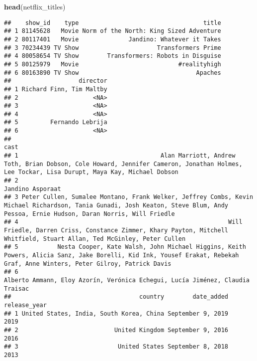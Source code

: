 \documentclass[
]{article}
\newenvironment{Shaded}{\begin{snugshade}}{\end{snugshade}}
\newcommand{\KeywordTok}[1]{\textcolor[rgb]{0.13,0.29,0.53}{\textbf{#1}}}
\newcommand{\NormalTok}[1]{#1}
\begin{document}
\begin{Shaded}
\begin{Highlighting}[]
\KeywordTok{head}\NormalTok{(netflix_titles)}
\end{Highlighting}
\end{Shaded}

\begin{verbatim}
##    show_id    type                                   title
## 1 81145628   Movie Norm of the North: King Sized Adventure
## 2 80117401   Movie              Jandino: Whatever it Takes
## 3 70234439 TV Show                      Transformers Prime
## 4 80058654 TV Show        Transformers: Robots in Disguise
## 5 80125979   Movie                            #realityhigh
## 6 80163890 TV Show                                 Apaches
##                   director
## 1 Richard Finn, Tim Maltby
## 2                     <NA>
## 3                     <NA>
## 4                     <NA>
## 5         Fernando Lebrija
## 6                     <NA>
##                                                                                                                                                                                 cast
## 1                                        Alan Marriott, Andrew Toth, Brian Dobson, Cole Howard, Jennifer Cameron, Jonathan Holmes, Lee Tockar, Lisa Durupt, Maya Kay, Michael Dobson
## 2                                                                                                                                                                   Jandino Asporaat
## 3 Peter Cullen, Sumalee Montano, Frank Welker, Jeffrey Combs, Kevin Michael Richardson, Tania Gunadi, Josh Keaton, Steve Blum, Andy Pessoa, Ernie Hudson, Daran Norris, Will Friedle
## 4                                                           Will Friedle, Darren Criss, Constance Zimmer, Khary Payton, Mitchell Whitfield, Stuart Allan, Ted McGinley, Peter Cullen
## 5           Nesta Cooper, Kate Walsh, John Michael Higgins, Keith Powers, Alicia Sanz, Jake Borelli, Kid Ink, Yousef Erakat, Rebekah Graf, Anne Winters, Peter Gilroy, Patrick Davis
## 6                                                                                                      Alberto Ammann, Eloy Azorín, Verónica Echegui, Lucía Jiménez, Claudia Traisac
##                                    country        date_added release_year
## 1 United States, India, South Korea, China September 9, 2019         2019
## 2                           United Kingdom September 9, 2016         2016
## 3                            United States September 8, 2018         2013

\end{verbatim}
\end{document}
